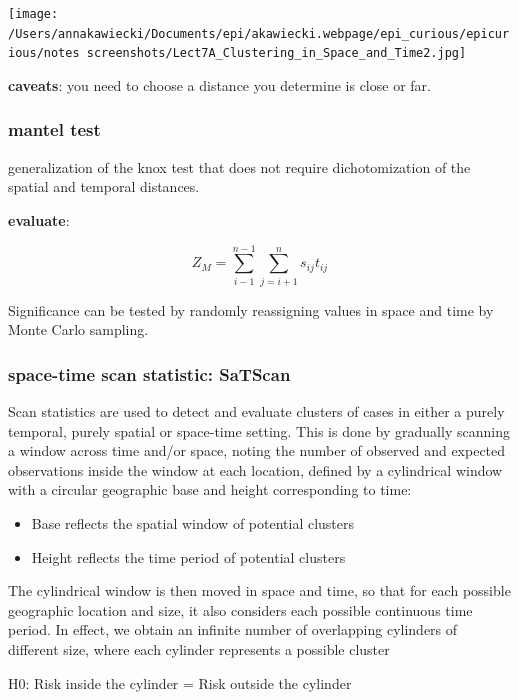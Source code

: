 \documentclass[
]{article}
\begin{document}
\texttt{[image: /Users/annakawiecki/Documents/epi/akawiecki.webpage/epi\_curious/epicurious/notes screenshots/Lect7A\_Clustering\_in\_Space\_and\_Time2.jpg]}

\textbf{caveats}: you need to choose a distance you determine is close
or far.

\hypertarget{mantel-test}{%
\subsubsection{mantel test}\label{mantel-test}}

generalization of the knox test that does not require dichotomization of
the spatial and temporal distances.

\textbf{evaluate}:

\[Z_M = \sum_{i-1}^{n-1}\sum_{j=i+1}^{n}s_{ij}t_{ij}\]

Significance can be tested by randomly reassigning values in space and
time by Monte Carlo sampling.

\hypertarget{space-time-scan-statistic-satscan}{%
\subsubsection{space-time scan statistic:
SaTScan}\label{space-time-scan-statistic-satscan}}

Scan statistics are used to detect and evaluate clusters of cases in
either a purely temporal, purely spatial or space-time setting. This is
done by gradually scanning a window across time and/or space, noting the
number of observed and expected observations inside the window at each
location, defined by a cylindrical window with a circular geographic
base and height corresponding to time:

\begin{itemize}
\item
  Base reflects the spatial window of potential clusters
\item
  Height reflects the time period of potential clusters
\end{itemize}

The cylindrical window is then moved in space and time, so that for each
possible geographic location and size, it also considers each possible
continuous time period. In effect, we obtain an infinite number of
overlapping cylinders of different size, where each cylinder represents
a possible cluster

H0: Risk inside the cylinder = Risk outside the cylinder
\end{document}
